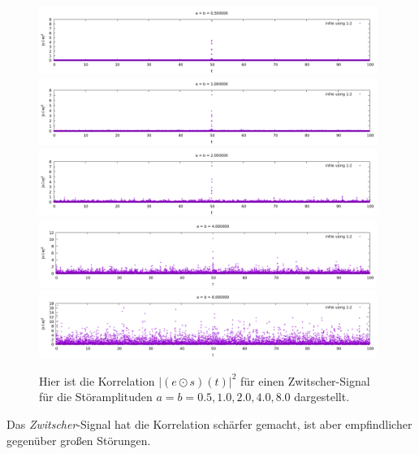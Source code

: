 \documentclass[ngerman]{scrartcl}
\begin{document}
\begin{figure}[htbp]
 	\centering
 	\includegraphics[width=0.98\textwidth]{plots/zwitscher/0.5}
 	\includegraphics[width=0.98\textwidth]{plots/zwitscher/1.0}
 	\includegraphics[width=0.98\textwidth]{plots/zwitscher/2.0}
 	\includegraphics[width=0.98\textwidth]{plots/zwitscher/4.0}
 	\includegraphics[width=0.98\textwidth]{plots/zwitscher/8.0}
	\caption[$|(e \odot s)(t)|^2$]{Hier ist die Korrelation $|(e \odot s)(t)|^2$ für einen Zwitscher-Signal für die Störamplituden $a=b=0.5, 1.0, 2.0, 4.0, 8.0$ dargestellt.}
	\label{fig:5.1}
\end{figure} 
Das \emph{Zwitscher}-Signal hat die Korrelation sch\"arfer gemacht,
ist aber empfindlicher gegen\"uber großen St\"orungen.
\end{document}
